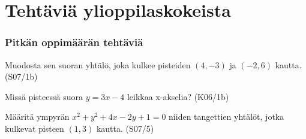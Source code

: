 \section{Tehtäviä ylioppilaskokeista}

\subsubsection*{Pitkän oppimäärän tehtäviä}

\begin{tehtava}
	Muodosta sen suoran yhtälö, joka kulkee pisteiden $(4, -3)$ ja $(-2,6)$ kautta. (S07/1b)
\end{tehtava}

\begin{tehtava}
	Missä pisteessä suora $y=3x-4$ leikkaa x-akselia? (K06/1b)
\end{tehtava}

\begin{tehtava}
	Määritä ympyrän $x^2+y^2+4x-2y+1=0$ niiden tangettien yhtälöt, jotka kulkevat pisteen $(1,3)$ kautta. (S07/5)
\end{tehtava}


